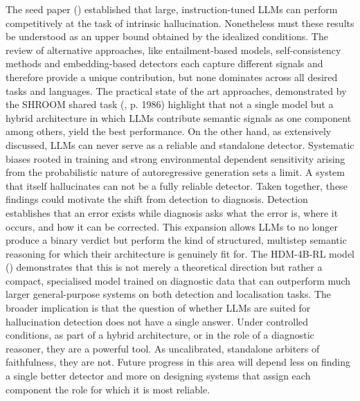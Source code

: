 \documentclass[
  seminar,   	 
  english,   	 
  titlepage=on,
  captions=tableheadings
]{ttlab-qualify}
\begin{document}
The seed paper (\cite{Gogoulou2025LLMHallucinationDetection}) established that large, instruction-tuned LLMs can perform competitively at the task of intrinsic hallucination. Nonetheless must these results be understood as an upper bound obtained by the idealized conditions. The review of alternative approaches, like entailment-based models, self-consistency methods and embedding-based detectors each capture different signals and therefore provide a unique contribution, but none dominates across all desired tasks and languages. The practical state of the art approaches, demonstrated by the SHROOM shared task (\cite{mickus2024shroom}, p. 1986) highlight that not a single model but a hybrid architecture in which LLMs contribute semantic signals as one component among others, yield the best performance. On the other hand, as extensively discussed, LLMs can never serve as a reliable and standalone detector. Systematic biases rooted in training and strong environmental dependent sensitivity arising from the probabilistic nature of autoregressive generation sets a limit. A system that itself hallucinates can not be a fully reliable detector.
Taken together, these findings could motivate the shift from detection to diagnosis. Detection establishes that an error exists while diagnosis asks what the error is, where it occurs, and how it can be corrected. This expansion allows LLMs to no longer produce a binary verdict but perform the kind of structured, multistep semantic reasoning for which their architecture is genuinely fit for. The HDM-4B-RL model (\cite{liu2025detection}) demonstrates that this is not merely a theoretical direction but rather a compact, specialised model trained on diagnostic data that can outperform much larger general-purpose systems on both detection and localisation tasks.
The broader implication is that the question of whether LLMs are suited for hallucination detection does not have a single answer. Under controlled conditions, as part of a hybrid architecture, or in the role of a diagnostic reasoner, they are a powerful tool. As uncalibrated, standalone arbiters of faithfulness, they are not. Future progress in this area will depend less on finding a single better detector and more on designing systems that assign each component the role for which it is most reliable.
\end{document}

